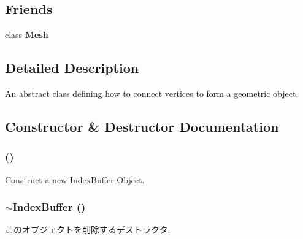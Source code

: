 \subsection*{Friends}
\begin{CompactItemize}
\item 
\hypertarget{classm3g_1_1IndexBuffer_a41a130f156b145bffb3f4b5172c4c93}{
class \textbf{Mesh}}
\label{classm3g_1_1IndexBuffer_a41a130f156b145bffb3f4b5172c4c93}

\end{CompactItemize}


\subsection{Detailed Description}
An abstract class defining how to connect vertices to form a geometric object. 

\subsection{Constructor \& Destructor Documentation}
\hypertarget{classm3g_1_1IndexBuffer_d2e68a2d7c6c753d3abfeef42ee79427}{
\subsubsection[{IndexBuffer}]{ ()}}
\label{classm3g_1_1IndexBuffer_d2e68a2d7c6c753d3abfeef42ee79427}


Construct a new \hyperlink{classm3g_1_1IndexBuffer}{IndexBuffer} Object. \hypertarget{classm3g_1_1IndexBuffer_ac7952364fe4d2d7b2731da5380c841c}{
\subsubsection[{$\sim$IndexBuffer}]{\setlength{\rightskip}{0pt plus 5cm}$\sim${\bf IndexBuffer} ()}}
\label{classm3g_1_1IndexBuffer_ac7952364fe4d2d7b2731da5380c841c}


このオブジェクトを削除するデストラクタ. 

